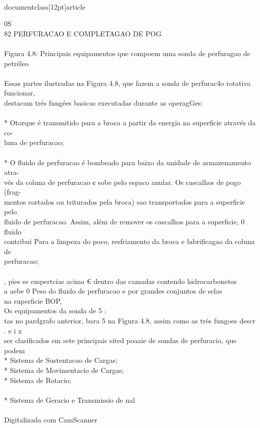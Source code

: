 \\documentclass[12pt]{article}
\begin{document}
0S\\
82 PERFURACAO E COMPLETAGAO DE POG\\
\\
Figura 4.8: Principais equipamentos que compoem uma sonda de perfuragao de petréleo\\
\\
Essas partes ilustradas na Figura 4.8, que fazem a sonda de perfurac4o rotativa funcionar,\\
destacam trés fungées basicas executadas durante as operagGes:\\
\\
* Otorque é transmitido para a broca a partir da energia na superficie através da co-\\
luna de perfuracao;\\
\\
* O fluido de perfuracao é bombeado para baixo da unidade de armazenamento atra-\\
vés da coluna de perfuracao ¢ sobe pelo espaco anular. Os cascalhos de pogo (frag-\\
mentos cortados ou triturados pela broca) sao transportados para a superficie pelo\\
fluido de perfuracao. Assim, além de remover os cascalhos para a superficie, 0 fluido\\
contribui Para a limpeza do poco, resfriamento da broca e lubrificagao da coluna de\\
perfuracao;\\
\\
, pies se empertcias acima € dentro das camadas contendo hidrocarbonetos\\
a aebe 0 Peso do fluido de perfuracao e por grandes conjuntos de selas\\
na superficie BOP,\\
Os equipamentos da sonda de 5 :\\
tas no pardgrafo anterior, bara 5 na Figura 4.8, assim como as trés fungoes descr\\
. e i x\\
ser clasificados em sete principais sited poaaie de sondas de perfuracio, que podem\\
* Sistema de Sustentacao de Cargas;\\
* Sistema de Movimentacio de Cargas;\\
* Sistema de Rotacio;\\
\\
* Sistema de Geracio e Transmissio de nal\\
\\
Digitalizada com CamScanner\\
\end{document}

